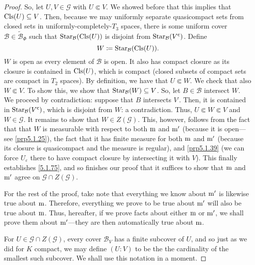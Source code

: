 \begin{thm}
\begin{savenotes}
\begin{proof}
So, let $U,V\in \mathcal{G}$ with $U\Subset V$.  We showed before that this implies that $\operatorname{Cls} (U)\subseteq V$.  Then, because we may uniformly separate quasicompact sets from closed sets in uniformly-completely-$T_3$ spaces, there is some uniform cover $\mathcal{B}\in \widetilde{\mathcal{B}}_{\Phi}$ such that $\operatorname{Star} _{\mathcal{B}}(\operatorname{Cls} (U))$ is disjoint from $\operatorname{Star} _{\mathcal{B}}(V^{\mathsf{c}})$.  Define
\begin{equation}
W\coloneqq \operatorname{Star} _{\mathcal{B}}(\operatorname{Cls} (U)).
\end{equation}
$W$ is open as every element of $\mathcal{B}$ is open.  It also has compact closure as its closure is contained in $\operatorname{Cls} (U)$, which is compact (closed subsets of compact sets are compact in $T_2$ spaces).  By definition, we have that $U\Subset W$.  We check that also $W\Subset V$.  To show this, we show that $\operatorname{Star} _{\mathcal{B}}(W)\subseteq V$.  So, let $B\in \mathcal{B}$ intersect $W$.  We proceed by contradiction:  suppose that $B$ intersects $V^{\comp}$.  Then, it is contained in $\operatorname{Star} _{\mathcal{B}}(V^{\mathsf{c}})$, which is disjoint from $W$:  a contradiction.  Thus, $U\Subset W\Subset V$ and $W\in \mathcal{G}$.  It remains to show that $W\in Z(\mathcal{G})$.  This, however, follows from the fact that that $W$ is measurable with respect to both $\mathrm{m}$ and $\mathrm{m} '$ (because it is open---see \cref{prp5.1.25}), the fact that it has finite measure for both $\mathrm{m}$ and $\mathrm{m} '$ (because its closure is quasicompact and the measure is regular), and \cref{prp5.1.39} (we can force $U_{\varepsilon}$ there to have compact closure by intersecting it with $V$).  This finally establishes \eqref{5.1.75}, and so finishes our proof that it suffices to show that $\mathrm{m}$ and $\mathrm{m} '$ agree on $\mathcal{G}\cap Z(\mathcal{G})$.

For the rest of the proof, take note that everything we know about $\mathrm{m} '$ is likewise true about $\mathrm{m}$.  Therefore, everything we prove to be true about $\mathrm{m} '$ will also be true about $\mathrm{m}$.  Thus, hereafter, if we prove facts about either $\mathrm{m}$ or $\mathrm{m} '$, we shall prove them about $\mathrm{m} '$---they are then automatically true about $\mathrm{m}$.

For $U\in \mathcal{G}\cap Z(\mathcal{G})$, every cover $\mathcal{B}_V$ has a finite subcover of $U$, and so just as we did for $K$ compact, we may define $(U:V)$ to be the the cardinality of the smallest such subcover.  We shall use this notation in a moment.


\end{proof}
\end{savenotes}
\end{thm}

